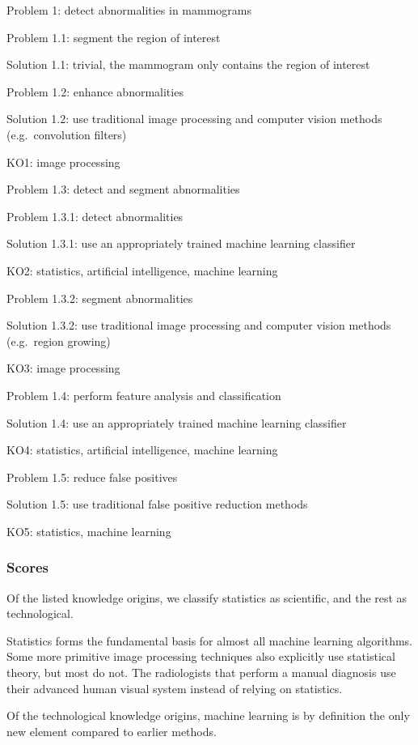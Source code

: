 Problem 1: detect abnormalities in mammograms

Problem 1.1: segment the region of interest

Solution 1.1: trivial, the mammogram only contains the region of interest

Problem 1.2: enhance abnormalities

Solution 1.2: use traditional image processing and computer vision methods
(e.g.\ convolution filters)

KO1: image processing

Problem 1.3: detect and segment abnormalities

Problem 1.3.1: detect abnormalities

Solution 1.3.1: use an appropriately trained machine learning classifier

KO2: statistics, artificial intelligence, machine learning

Problem 1.3.2: segment abnormalities

Solution 1.3.2: use traditional image processing and computer vision methods
(e.g.\ region growing)

KO3: image processing

Problem 1.4: perform feature analysis and classification

Solution 1.4: use an appropriately trained machine learning classifier

KO4: statistics, artificial intelligence, machine learning

Problem 1.5: reduce false positives

Solution 1.5: use traditional false positive reduction methods

KO5: statistics, machine learning

\subsubsection{Scores}
Of the listed knowledge origins, we classify statistics as scientific, and
the rest as technological.

Statistics forms the fundamental basis for almost all machine learning
algorithms. Some more primitive image processing techniques also explicitly use
statistical theory, but most do not. The radiologists that perform a manual
diagnosis use their advanced human visual system instead of relying on
statistics.

Of the technological knowledge origins, machine learning is by definition the
only new element compared to earlier methods.

